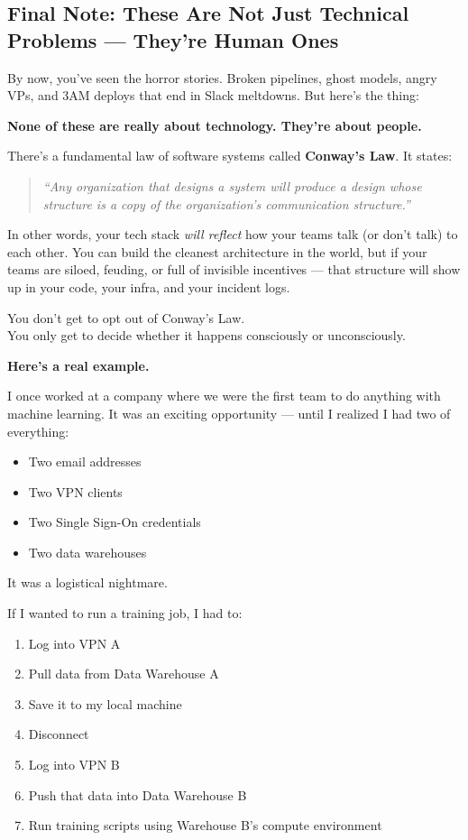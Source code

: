 \subsection{Final Note: These Are Not Just Technical Problems — They’re Human Ones}

By now, you’ve seen the horror stories. Broken pipelines, ghost models, angry VPs, and 3AM deploys that end in Slack meltdowns. But here’s the thing:

\textbf{None of these are really about technology. They’re about people.}

There’s a fundamental law of software systems called \textbf{Conway’s Law}. It states:

\begin{quote}
\textit{“Any organization that designs a system will produce a design whose structure is a copy of the organization’s communication structure.”}
\end{quote}

In other words, your tech stack \textit{will reflect} how your teams talk (or don’t talk) to each other. You can build the cleanest architecture in the world, but if your teams are siloed, feuding, or full of invisible incentives — that structure will show up in your code, your infra, and your incident logs.

You don’t get to opt out of Conway’s Law.\\
You only get to decide whether it happens consciously or unconsciously.

\vspace{1em}

\noindent\textbf{Here’s a real example.}

I once worked at a company where we were the first team to do anything with machine learning. It was an exciting opportunity — until I realized I had two of everything:

\begin{itemize}
    \item Two email addresses
    \item Two VPN clients
    \item Two Single Sign-On credentials
    \item Two data warehouses
\end{itemize}

It was a logistical nightmare.

If I wanted to run a training job, I had to:
\begin{enumerate}
    \item Log into VPN A
    \item Pull data from Data Warehouse A
    \item Save it to my local machine
    \item Disconnect
    \item Log into VPN B
    \item Push that data into Data Warehouse B
    \item Run training scripts using Warehouse B’s compute environment
\end{enumerate}

